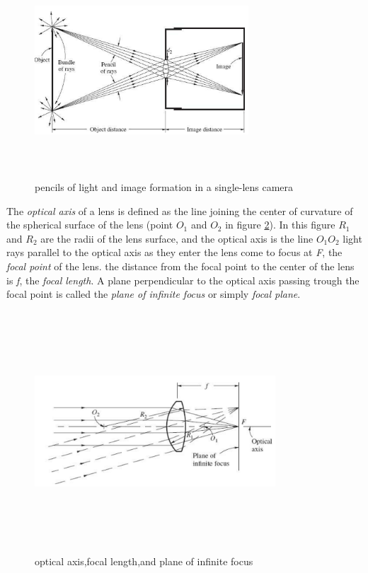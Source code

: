 \begin{figure}[H]
\centering
\includegraphics[width=8cm,height=8cm,keepaspectratio]{imagenes/lens.PNG}
\caption{pencils of light and image formation in a single-lens camera}
\label{fig:lens}
\end{figure}
The \textit{optical axis} of a lens is defined as the line joining the center of curvature of the spherical surface of the lens (point $O_{1}$ and $O_{2}$ in figure \ref{fig:optical_axis}). In this figure $R_{1}$ and $R_{2}$ are the radii of the lens surface, and the optical axis is the line $O_{1}O_{2}$ light rays parallel to the optical axis as they enter the lens come to focus at \textit{F}, the \textit{focal point} of the lens. the distance from the focal point to the center of the lens is \textit{f}, the \textit{focal length}. A plane perpendicular to the optical axis passing trough the focal point is called the \textit{plane of infinite focus} or simply \textit{focal plane}\cite{elements_photogrammetry}.
\begin{figure}[H]
\centering
\includegraphics[width=9cm,height=9cm,keepaspectratio]{imagenes/optical_axis.PNG}
\caption{optical axis,focal length,and plane of infinite focus}
\label{fig:optical_axis}
\end{figure}
